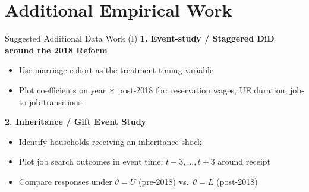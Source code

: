 \documentclass[aspectratio=169, 11pt]{beamer}
\newcommand{\wR}{w^R}
\begin{document}

\section{Additional Empirical Work}

\begin{frame}{Suggested Additional Data Work (I)}
\textbf{1. Event-study / Staggered DiD around the 2018 Reform}
\begin{itemize}
  \item Use marriage cohort as the treatment timing variable
  \item Plot coefficients on year $\times$ post-2018 for: reservation wages, UE duration, job-to-job transitions
\end{itemize}
\vspace{1.5em}
\textbf{2. Inheritance / Gift Event Study}
\begin{itemize}
  \item Identify households receiving an inheritance shock 
  \item Plot job search outcomes in event time: $t-3, \ldots, t+3$ around receipt
  \item Compare responses under $\theta = U$ (pre-2018) vs.\ $\theta = L$ (post-2018)
\end{itemize}
\end{frame}
\end{document}
